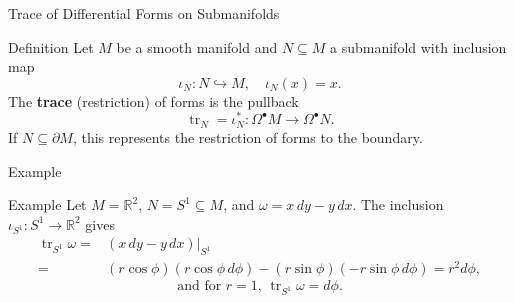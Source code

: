 \begin{frame}{Trace of Differential Forms on Submanifolds}
\begin{block}{Definition}
Let \(M\) be a smooth manifold and \(N\subseteq M\) a submanifold with inclusion map
\[
\iota_N:N\hookrightarrow M,\quad \iota_N(x)=x.
\]
The \textbf{trace} (restriction) of forms is the pullback
\[
\operatorname{tr}_N=\iota_N^*:\Omega^\bullet M\to\Omega^\bullet N.
\]
If \(N\subseteq\partial M\), this represents the restriction of forms to the boundary.
\end{block}
\end{frame}


\begin{frame}{Example}
\vspace{-0.3cm}
\begin{block}{Example}
Let \(M=\mathbb{R}^2\), \(N=S^1\subseteq M\), and \(\omega=x\,dy - y\,dx\).
The inclusion \(\iota_{S^1}:S^1\to\mathbb{R}^2\) gives
\vspace{-0.3cm}
\begin{align*}
\operatorname{tr}_{S^1}\omega
=&(x\,dy - y\,dx)\big|_{S^1}\\
=&(r\cos\phi)(r\cos\phi\,d\phi)-(r\sin\phi)(-r\sin\phi\,d\phi) =r^2d\phi,
\end{align*}
\[
\text{and for \(r=1\),\ }\operatorname{tr}_{S^1}\omega=d\phi.
\]
\end{block}
\vspace{-0.3cm}
\begin{center}
\end{center}
\end{frame}


